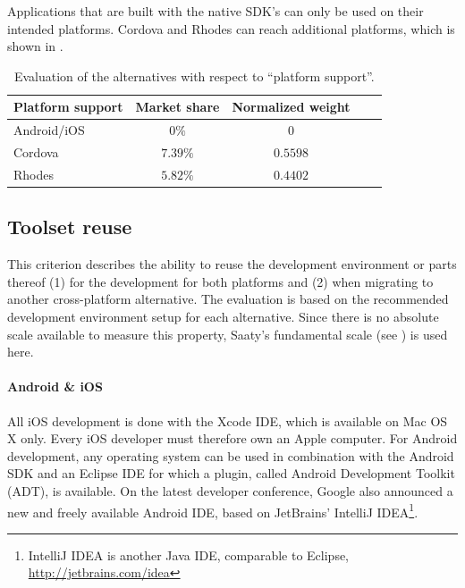 Applications that are built with the native SDK's can only be used on their intended platforms. Cordova and Rhodes can reach additional platforms, which is shown in . 

\begin{table}[h!]
    \centering
    \begin{tabular}{lcccl}
        \hline
        \textbf{Platform support} & Market share & Normalized weight \\
        \hline
        Android/iOS               & $0\%$        & $0$               \\
        Cordova                   & $7.39\%$     & $0.5598$          \\
        Rhodes                    & $5.82\%$     & $0.4402$          \\
        \hline
    \end{tabular}
    \caption{Evaluation of the alternatives with respect to ``platform support''.}
    \label{tab:ps}
\end{table}

\subsection{Toolset reuse}

This criterion describes the ability to reuse the development environment or parts thereof (1) for the development for both platforms and (2) when migrating to another cross-platform alternative. The evaluation is based on the recommended development environment setup for each alternative. Since there is no absolute scale available to measure this property, Saaty's fundamental scale (see ) is used here.

\paragraph{Android \& iOS} All iOS development is done with the Xcode IDE, which is available on Mac OS X only. Every iOS developer must therefore own an Apple computer. For Android development, any operating system can be used in combination with the Android SDK and an Eclipse IDE for which a plugin, called Android Development Toolkit (ADT), is available. On the latest developer conference, Google also announced a new and freely available Android IDE, based on JetBrains' IntelliJ IDEA\footnote{IntelliJ IDEA is another Java IDE, comparable to Eclipse, \url{http://jetbrains.com/idea}}.

